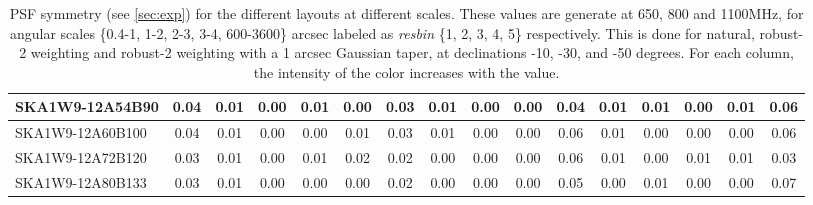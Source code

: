 \begin{table}[H]
{{\begin{tabular}{|lccccc||ccccc||ccccc|}
SKA1W9-12A54B90 & 0.04 \cellcolor{blue!60.00} & 0.01 \cellcolor{red!18.00} & 0.00 \cellcolor{green!18.00} & 0.01 \cellcolor{orange!60.00} & 0.00 \cellcolor{purple!18.00} & 0.03 \cellcolor{blue!60.00} & 0.01 \cellcolor{red!60.00} & 0.00 \cellcolor{green!18.00} & 0.00 \cellcolor{orange!18.00} & 0.04 \cellcolor{purple!32.00} & 0.01 \cellcolor{blue!39.00} & 0.01 \cellcolor{red!60.00} & 0.00 \cellcolor{green!18.00} & 0.01 \cellcolor{orange!60.00} & 0.06 \cellcolor{purple!43.20}\\ \hline 
SKA1W9-12A60B100 & 0.04 \cellcolor{blue!60.00} & 0.01 \cellcolor{red!18.00} & 0.00 \cellcolor{green!18.00} & 0.00 \cellcolor{orange!18.00} & 0.01 \cellcolor{purple!39.00} & 0.03 \cellcolor{blue!60.00} & 0.01 \cellcolor{red!60.00} & 0.00 \cellcolor{green!18.00} & 0.00 \cellcolor{orange!18.00} & 0.06 \cellcolor{purple!60.00} & 0.01 \cellcolor{blue!39.00} & 0.00 \cellcolor{red!18.00} & 0.00 \cellcolor{green!18.00} & 0.00 \cellcolor{orange!18.00} & 0.06 \cellcolor{purple!43.20}\\ \hline 
SKA1W9-12A72B120 & 0.03 \cellcolor{blue!18.00} & 0.01 \cellcolor{red!18.00} & 0.00 \cellcolor{green!18.00} & 0.01 \cellcolor{orange!60.00} & 0.02 \cellcolor{purple!60.00} & 0.02 \cellcolor{blue!18.00} & 0.00 \cellcolor{red!18.00} & 0.00 \cellcolor{green!18.00} & 0.00 \cellcolor{orange!18.00} & 0.06 \cellcolor{purple!60.00} & 0.01 \cellcolor{blue!39.00} & 0.00 \cellcolor{red!18.00} & 0.01 \cellcolor{green!60.00} & 0.01 \cellcolor{orange!60.00} & 0.03 \cellcolor{purple!18.00}\\ \hline 
SKA1W9-12A80B133 & 0.03 \cellcolor{blue!18.00} & 0.01 \cellcolor{red!18.00} & 0.00 \cellcolor{green!18.00} & 0.00 \cellcolor{orange!18.00} & 0.00 \cellcolor{purple!18.00} & 0.02 \cellcolor{blue!18.00} & 0.00 \cellcolor{red!18.00} & 0.00 \cellcolor{green!18.00} & 0.00 \cellcolor{orange!18.00} & 0.05 \cellcolor{purple!46.00} & 0.00 \cellcolor{blue!18.00} & 0.01 \cellcolor{red!60.00} & 0.00 \cellcolor{green!18.00} & 0.00 \cellcolor{orange!18.00} & 0.07 \cellcolor{purple!51.60}\\ \hline 
\end{tabular}}
\vspace{-0.300000cm}
\hspace{1cm} 

\vspace{.50cm}
\caption{PSF symmetry (see \autoref{sec:exp})  for the different layouts at different scales. These values are generate at 650, 800 and 1100MHz, for angular scales \{0.4-1, 1-2, 2-3, 3-4, 600-3600\} arcsec labeled as {\it resbin} \{1, 2, 3, 4, 5\} respectively. This is done for natural, robust-2 weighting and robust-2 weighting with a 1 arcsec Gaussian taper, at declinations -10, -30, and -50 degrees. For each column, the intensity of the color increases with the value.}\label{tab:psf_sym}}
 \end{table}
